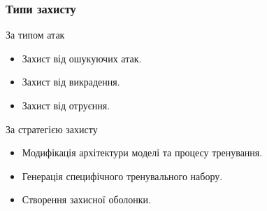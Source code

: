 \documentclass{beamer}
\numberwithin{equation}{section}
\begin{document}
	\begin{frame}
		\frametitle{Типи захисту}
		\begin{block} {За типом атак} 
			\begin{itemize}
				\item Захист від ошукуючих атак.
				\item Захист від викрадення.
				\item Захист від отруєння.
			\end{itemize}
		\end{block}
		\vspace{.5cm}
		\begin{block} {За стратегією захисту}
			\begin{itemize}
				\item Модифікація архітектури моделі та процесу тренування.
				\item Генерація специфічного тренувального набору.
				\item Створення захисної оболонки.
			\end{itemize}
		\end{block}	
	\end{frame}

	
\end{document}
